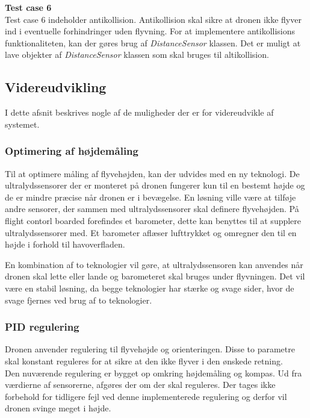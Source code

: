 \textbf{Test case 6}\\
Test case 6 indeholder antikollision. Antikollision skal sikre at dronen ikke flyver ind i eventuelle forhindringer uden flyvning. For at implementere antikollisions funktionaliteten, kan der gøres brug af \textit{DistanceSensor} klassen. Det er muligt at lave objekter af \textit{DistanceSensor} klassen som skal bruges til altikollision. 

\newpage

\subsection{Videreudvikling}

I dette afsnit beskrives nogle af de muligheder der er for videreudvikle af systemet.  

\subsubsection*{Optimering af højdemåling}
Til at optimere måling af flyvehøjden, kan der udvides med en ny teknologi. De ultralydssensorer der er monteret på dronen fungerer kun til en bestemt højde og de er mindre præcise når dronen er i bevægelse. En løsning ville være at tilføje andre sensorer, der sammen med ultralydssensorer skal definere flyvehøjden. På flight contorl boarded forefindes et barometer, dette kan benyttes til at supplere ultralydssensorer med.
Et barometer aflæser lufttrykket og omregner den til en højde i forhold til havoverfladen.

En kombination af to teknologier vil gøre, at ultralydssensoren kan anvendes når dronen skal lette eller lande og barometeret skal bruges under flyvningen. Det vil være en stabil løsning, da begge teknologier har stærke og svage sider, hvor de svage fjernes ved brug af to teknologier.

\subsubsection*{PID regulering}
Dronen anvender regulering til flyvehøjde og orienteringen. Disse to parametre skal konstant reguleres for at sikre at den ikke flyver i den ønskede retning. \\
Den nuværende regulering er bygget op omkring højdemåling og kompas. Ud fra værdierne af sensorerne, afgøres der om der skal reguleres. Der tages ikke forbehold for tidligere fejl ved denne implementerede regulering og derfor vil dronen svinge meget i højde.

